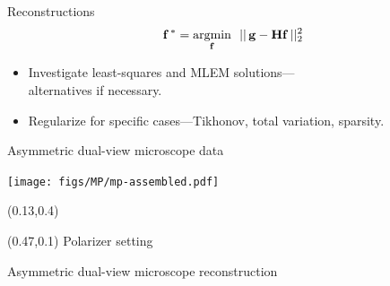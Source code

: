 \documentclass[presentation]{beamer}
\begin{document}
\begin{frame}[label=sec-1]{Reconstructions}
  \begin{align*}
\mathbf{f^{\thinspace *}}= \underset{\mathbf{f}}{\text{argmin}}
\ \ ||\thinspace\mathbf{g} - \mathbf{H}\mathbf{f}\thinspace||_2^2
  \end{align*} \vspace{1.5em}
  \centering 
  \begin{itemize}
  \item Investigate least-squares and MLEM solutions---\\alternatives if necessary.
  \item Regularize for specific cases---Tikhonov, total variation, sparsity.
  \end{itemize}

\end{frame}

\begin{frame}[label=sec-1]{Asymmetric dual-view microscope data}
  \vspace{1.5em}
 \begin{center}
   \texttt{[image: figs/MP/mp-assembled.pdf]}
 \end{center}
 \setlength{\TPHorizModule}{\textwidth}
 \setlength{\TPVertModule}{\textwidth}
\begin{textblock}{0.5}(0.13,0.4)
\end{textblock}
\begin{textblock}{0.5}(0.47,0.1)
  {Polarizer setting}
 \end{textblock}

\end{frame}

\begin{frame}{Asymmetric dual-view microscope reconstruction}
  \centering
\end{frame}
\end{document}
